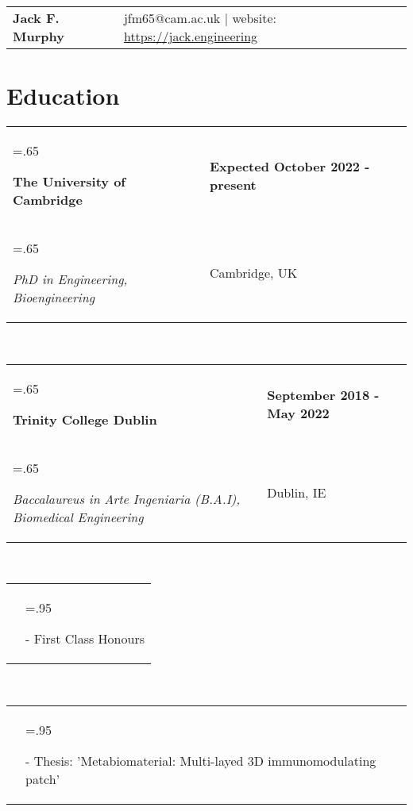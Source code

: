 \documentclass[letterpaper,11pt]{article}
\newcommand{\itemHeadings}[4]{
    \begin{tabularx}{\textwidth} {>{\hsize=.65\textwidth\raggedright\arraybackslash}X 
   >{\raggedleft\arraybackslash}X}
      #1 & \small#2 \\
      #3 & \small#4
    \end{tabularx}
    \\
}
\newcommand{\itemitems}[1]{
    \begin{tabularx}{\textwidth} {>{\raggedleft\arraybackslash}X >{\hsize=.95\textwidth\raggedright\arraybackslash}X}
      &- \small#1 \\
    \end{tabularx}
    \\
}
\newcommand{\heading}[3]{
    \hspace{-15mm}
    \begin{tabular}{p{.4\textwidth} >{\raggedleft}p{.57\textwidth}}
        \textbf{\Huge{#1}}\vspace{5mm} & #2 $|$ #3 \\
    \end{tabular}
}
\newcommand{\sect}[1]{
    \vspace{-.4em}
    \section*{#1}
    \vspace{-3.5mm}
}
\begin{document}
\heading
    {Jack F. Murphy}
    {jfm65@cam.ac.uk}
    {website: \href{https://jack.engineering}{https://jack.engineering}}

\noindent
\vspace{0cm}

\sect{Education}
    \itemHeadings
        {\textbf{The University of Cambridge}}
        {\textbf{Expected October 2022 - present}}
        {\hspace{5pt}\emph{PhD in Engineering, Bioengineering}}
        {Cambridge, UK}
    \itemHeadings
        {\textbf{Trinity College Dublin}}
        {\textbf{September 2018 - May 2022}}
        {\hspace{5pt}\emph{Baccalaureus in Arte Ingeniaria (B.A.I), Biomedical Engineering}}
        {Dublin, IE}
        \itemitems
            {First Class Honours}
        \itemitems
            {Thesis: 'Metabiomaterial: Multi-layed 3D immunomodulating patch'}

\end{document}

